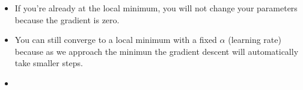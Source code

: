 \begin{itemize}[--]
	\item If you're already at the local minimum, you will not change your parameters because the gradient is zero.
	\item You can still converge to a local minimum with a fixed $\alpha$ (learning rate) because as we approach the minimun the gradient descent will automatically take smaller steps.
	\item 

\end{itemize}